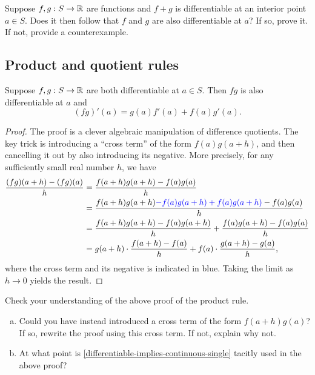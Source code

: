 \begin{exercise}
	Suppose $f, g : S \to \mathbb{R}$ are functions and $f + g$ is differentiable at an interior point $a \in S$. Does it then follow that $f$ and $g$ are also differentiable at $a$? If so, prove it. If not, provide a counterexample. 
\end{exercise}

\subsection{Product and quotient rules}

\begin{proposition} \label{product-rule-single} 
	Suppose $f, g : S \to \mathbb{R}$ are both differentiable at $a \in S$. Then $fg$ is also differentiable at $a$ and 
	\[ (fg)'(a) = g(a) f'(a) + f(a)g'(a). \]
\end{proposition}

\begin{proof}
	The proof is a clever algebraic manipulation of difference quotients. The key trick is introducing a ``cross term'' of the form $f(a)g(a+h)$, and then cancelling it out by also introducing its negative. More precisely, for any sufficiently small real number $h$, we have 
	\[ \begin{aligned} \frac{(fg)(a+h)-(fg)(a)}{h} &= \frac{f(a+h)g(a+h) - f(a)g(a)}{h} \\ 
	&= \frac{f(a+h)g(a+h) {\color{blue}-f(a)g(a+h) + f(a)g(a+h)} - f(a)g(a)}{h} \\
	&= \frac{f(a+h)g(a+h) - f(a)g(a+h)}{h} + \frac{f(a)g(a+h) - f(a)g(a)}{h} \\
	&= g(a+h) \cdot \frac{f(a+h) - f(a)}{h} + f(a) \cdot \frac{g(a+h) - g(a)}{h}, \end{aligned} \]
	where the cross term and its negative is indicated in blue. 
	Taking the limit as $h \to 0$ yields the result. 
\end{proof}

\begin{exercise}
	Check your understanding of the above proof of the product rule. 
\begin{enumerate}[(a)]
	\item Could you have instead introduced a cross term of the form $f(a+h)g(a)$? If so, rewrite the proof using this cross term. If not, explain why not. 
	\item At what point is \cref{differentiable-implies-continuous-single} tacitly used in the above proof?
\end{enumerate}
\end{exercise}

